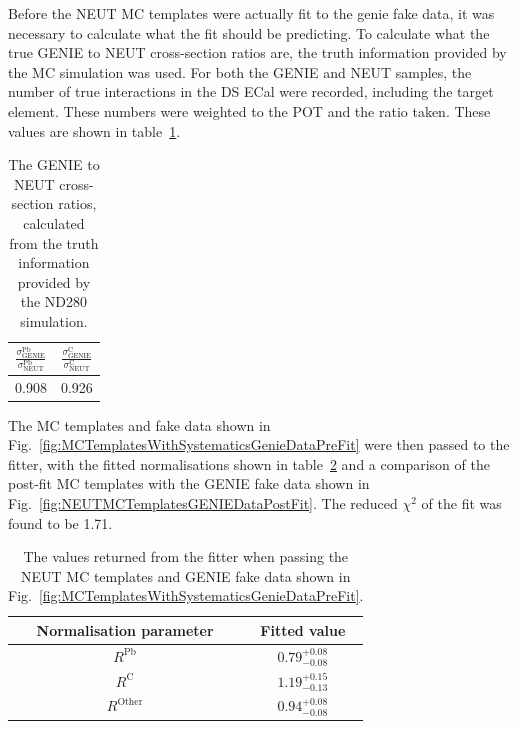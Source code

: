 \newline
\newline
Before the NEUT MC templates were actually fit to the genie fake data, it was necessary to calculate what the fit should be predicting.  To calculate what the true GENIE to NEUT cross-section ratios are, the truth information provided by the MC simulation was used.  For both the GENIE and NEUT samples, the number of true interactions in the DS ECal were recorded, including the target element.  These numbers were weighted to the POT and the ratio taken.  These values are shown in table~\ref{table:GENIEToNEUTTrueCrossSectioRatio}.  
\begin{table}
  \begin{tabular}{c c }
    $\frac{\sigma^{\textrm{Pb}}_{\textrm{GENIE}}}{\sigma^{\textrm{Pb}}_{\textrm{NEUT}}}$ &$\frac{\sigma^{\textrm{C}}_{\textrm{GENIE}}}{\sigma^{\textrm{C}}_{\textrm{NEUT}}}$\\ \hline \hline
    0.908 & 0.926  \\
  \end{tabular}
  \caption{The GENIE to NEUT cross-section ratios, calculated from the truth information provided by the ND280 simulation.}
  \label{table:GENIEToNEUTTrueCrossSectioRatio}
\end{table}
\newline
\newline
The MC templates and fake data shown in Fig.~\ref{fig:MCTemplatesWithSystematicsGenieDataPreFit} were then passed to the fitter, with the fitted normalisations shown in table~\ref{table:NEUTMCTemplatesGENIEDataPostFit} and a comparison of the post-fit MC templates with the GENIE fake data shown in Fig.~\ref{fig:NEUTMCTemplatesGENIEDataPostFit}.  The reduced $\chi^2$ of the fit was found to be 1.71.  
\begin{table}
  \begin{tabular}{c c }
    Normalisation parameter & Fitted value \\ \hline \hline
    $R^{\textrm{Pb}}$ & $0.79^{+0.08}_{-0.08}$  \\
    $R^{\textrm{C}}$ & $1.19^{+0.15}_{-0.13}$  \\
    $R^{\textrm{Other}}$ & $0.94^{+0.08}_{-0.08}$  \\
  \end{tabular}
  \caption{The values returned from the fitter when passing the NEUT MC templates and GENIE fake data shown in Fig.~\ref{fig:MCTemplatesWithSystematicsGenieDataPreFit}.}
  \label{table:NEUTMCTemplatesGENIEDataPostFit}
\end{table}
